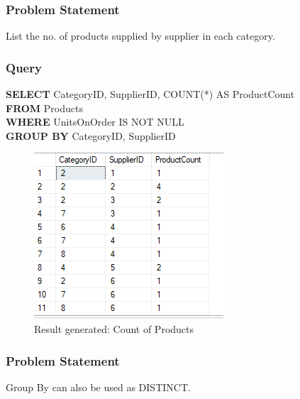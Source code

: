 \documentclass[12pt,a4paper]{report}
\begin{document}
\subsubsection{Problem Statement}
List the no. of products supplied by supplier in each category.
\subsubsection{Query}
\begin{center}
	\begin{minipage}{12cm}
		\textbf{SELECT} CategoryID, SupplierID, COUNT(*) AS ProductCount\\
		\textbf{FROM} Products\\
		\textbf{WHERE} UnitsOnOrder IS NOT NULL\\
		\textbf{GROUP BY} CategoryID, SupplierID
	\end{minipage}
	\begin{figure}[h]
	\centering
		\includegraphics[scale=0.7]{images/2.png}
		\caption{Result generated: Count of Products}
	\end{figure}
\end{center}
\newpage
\subsubsection{Problem Statement}
Group By can also be used as DISTINCT.
\end{document}
